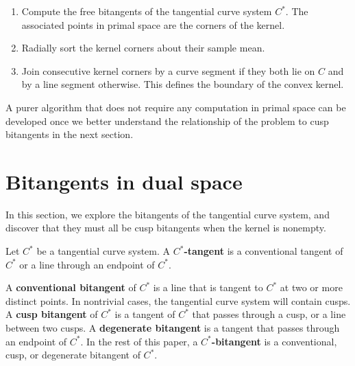 \documentclass[12pt]{article}
\begin{document}
\begin{enumerate}
\item	Compute the free bitangents of the tangential curve system $C^*$.
	The associated points in primal space are the corners of the kernel.
\item   Radially sort the kernel corners about their sample mean.
\item	Join consecutive kernel corners by a curve segment if they both lie
	on $C$ and by a line segment otherwise.
	This defines the boundary of the convex kernel.
\end{enumerate}

A purer algorithm that does not require any computation in primal space
can be developed once we better understand the relationship of the
problem to cusp bitangents in the next section.

\section{Bitangents in dual space}

In this section, we explore the bitangents of the tangential curve system,
and discover that they must all be cusp bitangents when the kernel is nonempty.


\begin{defn2}
\label{defn:bitang}
Let $C^*$ be a tangential curve system.
A {\bf $C^*$-tangent} is a conventional tangent of $C^*$
or a line through an endpoint of $C^*$.

A {\bf conventional bitangent} of $C^*$ is a line
that is tangent to $C^*$ at two or more distinct points.
In nontrivial cases, the tangential curve system will contain cusps.
A {\bf cusp bitangent} of $C^*$ is a tangent of $C^*$ that passes
through a cusp, or a line between two cusps.
A {\bf degenerate bitangent} is a tangent that passes through 
an endpoint of $C^*$.
In the rest of this paper, a {\bf $C^*$-bitangent} is a 
conventional, cusp, or degenerate bitangent of $C^*$.
\end{defn2}
\end{document}
